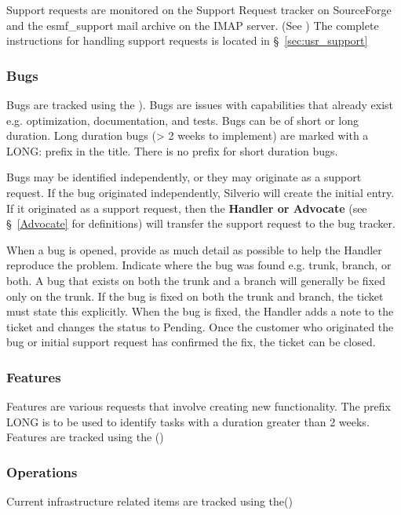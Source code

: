 Support requests are monitored on the Support Request tracker on 
SourceForge and the esmf\_support mail archive on the IMAP server. 
(See )
The complete instructions for handling support requests is located in  \S~\ref{sec:usr_support}

\subsubsection{Bugs}

Bugs are tracked using the ). Bugs are issues with capabilities that already exist e.g. optimization, documentation, and tests. Bugs can be of short or long duration.  Long duration bugs 
(> 2 weeks to implement) are marked with a LONG: prefix in the title.  There is no prefix for short duration bugs.

Bugs may be identified independently, or they may originate as a support request. If the bug originated 
independently, Silverio will create the initial entry. If it originated as a support request, then
the {\bf Handler or Advocate} (see \S~\ref{Advocate} for definitions) will transfer the
support request to the bug tracker. 

When a bug is opened, provide as much detail as possible to help the Handler reproduce the problem. 
Indicate where the bug was found e.g. trunk, branch, or both. A bug that exists on both the trunk and a 
branch will generally be fixed only on the trunk. If the bug is fixed on both the trunk and branch, the 
ticket must  state this explicitly. When the bug is fixed, the Handler adds a note to the ticket and changes the status to Pending. Once the customer who originated the bug or initial support request has confirmed the fix, the ticket can be closed. 

\subsubsection{Features}

Features are various requests that involve creating new functionality. The prefix LONG is to be used to identify tasks with a duration greater than 2 weeks. Features are tracked using the 
()

\subsubsection{Operations}
Current infrastructure related items are tracked using the()

